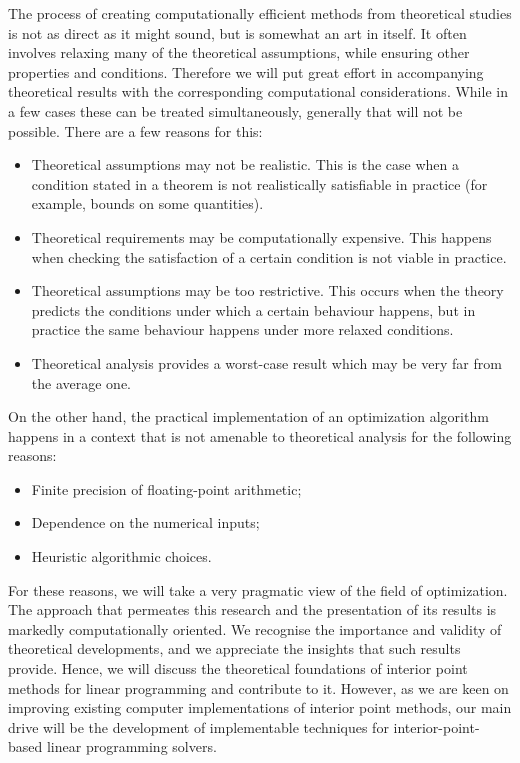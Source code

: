 The process of creating computationally efficient methods from
theoretical studies is not as direct as it might sound, but is somewhat
an art in itself. It often involves relaxing many of the theoretical 
assumptions, while ensuring other properties and conditions.
Therefore we will put great effort in accompanying theoretical
results with the corresponding computational considerations. While
in a few cases these can be treated simultaneously, generally that
will not be possible. There are a few reasons for this:
\begin{itemize}
\item Theoretical assumptions may not be realistic. This is the case
when a condition stated in a theorem is not realistically satisfiable 
in practice (for example, bounds on some quantities). 
\item Theoretical requirements may be computationally expensive. This 
happens when checking the satisfaction of a certain condition is not 
viable in practice.
\item Theoretical assumptions may be too restrictive. This occurs
when the theory predicts the conditions under which a certain behaviour
happens, but in practice the same behaviour happens under more relaxed
conditions.
\item Theoretical analysis provides a worst-case result which may be 
very far from the average one.
\end{itemize}

On the other hand, the practical implementation of an optimization
algorithm happens in a context that is not amenable to theoretical 
analysis for the following reasons:
\begin{itemize}
\item Finite precision of floating-point arithmetic;
\item Dependence on the numerical inputs;
\item Heuristic algorithmic choices.
\end{itemize}

For these reasons, we will take a very pragmatic view of the
field of optimization. 
The approach that permeates this research and 
the presentation of its results is markedly computationally oriented. 
We recognise the importance and validity of theoretical developments, 
and we appreciate the insights that such results provide.
Hence, we will discuss the theoretical foundations of 
interior point methods for linear programming and contribute to it.
However, as we are keen on improving existing computer implementations of 
interior point methods, 
our main drive will be the development of implementable techniques
for interior-point-based linear programming solvers.

